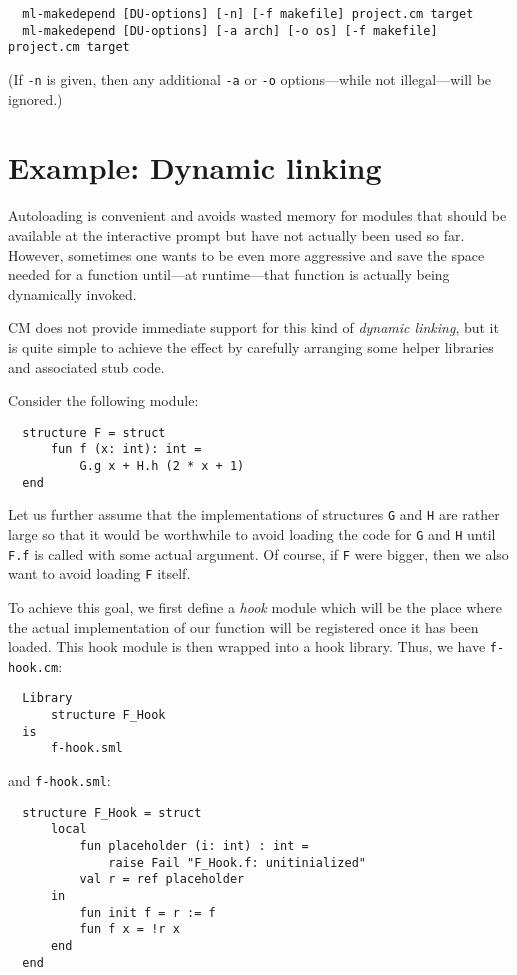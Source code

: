 \documentclass[titlepage,letterpaper]{article}
\begin{document}
\begin{verbatim}
  ml-makedepend [DU-options] [-n] [-f makefile] project.cm target
  ml-makedepend [DU-options] [-a arch] [-o os] [-f makefile] project.cm target
\end{verbatim}

(If {\tt -n} is given, then any additional {\tt -a} or {\tt -o}
options---while not illegal---will be ignored.)

\section{Example: Dynamic linking}
\label{sec:dynlink}

Autoloading is convenient and avoids wasted memory for modules that
should be available at the interactive prompt but have not actually
been used so far.  However, sometimes one wants to be even more
aggressive and save the space needed for a function until---at
runtime---that function is actually being dynamically invoked.

CM does not provide immediate support for this kind of {\em dynamic
linking}, but it is quite simple to achieve the effect by carefully
arranging some helper libraries and associated stub code.

Consider the following module:
\begin{verbatim}
  structure F = struct
      fun f (x: int): int =
          G.g x + H.h (2 * x + 1)
  end
\end{verbatim}

Let us further assume that the implementations of structures {\tt G}
and {\tt H} are rather large so that it would be worthwhile to avoid
loading the code for {\tt G} and {\tt H} until {\tt F.f} is called
with some actual argument.  Of course, if {\tt F} were bigger, then we
also want to avoid loading {\tt F} itself.

To achieve this goal, we first define a {\em hook} module which will
be the place where the actual implementation of our function will be
registered once it has been loaded.  This hook module is then wrapped
into a hook library.  Thus, we have {\tt f-hook.cm}:
\begin{verbatim}
  Library
      structure F_Hook
  is
      f-hook.sml
\end{verbatim}

and {\tt f-hook.sml}:

\begin{verbatim}
  structure F_Hook = struct
      local
          fun placeholder (i: int) : int =
              raise Fail "F_Hook.f: unitinialized"
          val r = ref placeholder
      in
          fun init f = r := f
          fun f x = !r x
      end
  end
\end{verbatim}
\end{document}
